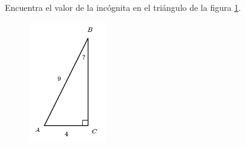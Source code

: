\question[15]  Encuentra el valor de la incógnita en el triángulo de la figura \ref{fig:angle_functrig_10}.
\begin{figure}[H]
    \begin{center}
        \includegraphics[width=0.3\textwidth]{../images/angle_functrig_10.png}
    \end{center}
    \caption{}
    \label{fig:angle_functrig_10}
\end{figure}